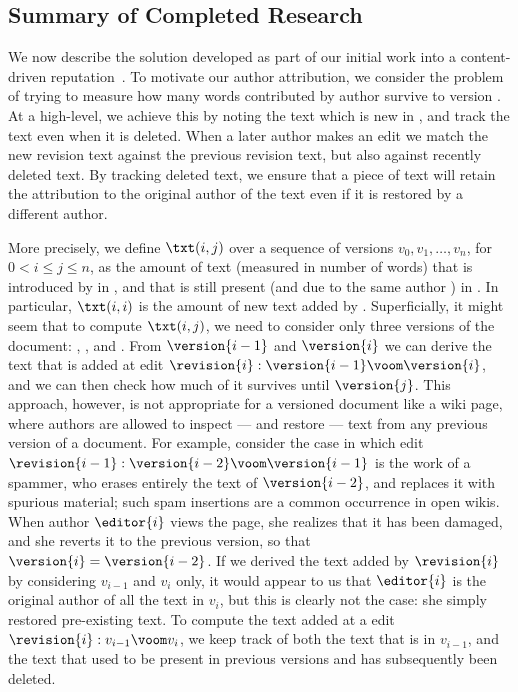 \subsection{Summary of Completed Research}

We now describe the solution
developed as part of our initial work into a
content-driven reputation~\cite{www07}.
To motivate our author attribution, we consider the problem of
trying to measure how many words contributed by author 
survive to version .
At a high-level, we achieve this by noting the text which
is new in , and track the text even when it is deleted. 
When a later author makes an edit we match the new revision text
against the previous revision text, but also against recently
deleted text.
By tracking deleted text, we ensure that a piece of text
will retain the attribution to the original author of the text
even if it is restored by a different author.

More precisely,
we define $\txt(i,j)$
over a
sequence of versions $v_0, v_1, \ldots, v_n$,
for $0 < i \leq j \leq n$, as the amount of text
(measured in number of words) that is introduced
by  in ,
and that is still present (and due to the same author )
in .
In particular, $\txt(i,i)$ is the amount of new text added by .
Superficially, it might seem that to compute $\txt(i,j)$, we need to
consider only three versions of the document: ,
, and
.
From $\version{i-1}$ and $\version{i}$
we can derive the text that is added at edit
$\revision{i}: \version{i-1} \voom \version{i}$,
and we can then check how much of it
survives until $\version{j}$.
This approach, however, is not appropriate for a versioned document
like a wiki page, where authors are allowed to inspect --- and restore
--- text from any previous version of a document.
For example, consider the case in which edit
$\revision{i-1}: \version{i-2} \voom \version{i-1}$ is the work
of a spammer, who erases entirely the text of $\version{i-2}$, and replaces
it with spurious material; such spam insertions are a common
occurrence in open wikis.
When author $\editor{i}$ views the page, she realizes that it has been damaged,
and she reverts it to the previous version, so that
$\version{i} = \version{i-2}$.
If we derived the text added by $\revision{i}$ by considering $v_{i-1}$ and
$v_i$ only, it would appear to us that $\editor{i}$ is the original author of
all the text in $v_i$, but this is clearly not the case: she simply
restored pre-existing text.
To compute the text added at a edit $\revision{i}: v_{i-1} \voom v_i$,
we keep track of both the text that is in $v_{i-1}$, and the text that used to
be present in previous versions and has subsequently been deleted.

